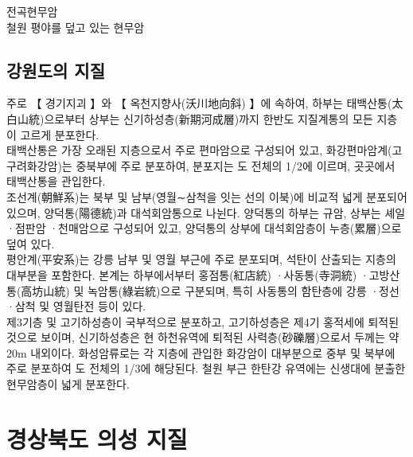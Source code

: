 \documentclass[12pt,a4paper]{book}
\newcommand{\SectionMargin}			{\newpage  \null \vskip 0cm}
\begin{document}
전곡현무암\\

철원 평야를 덮고 있는 현무암\\


	\SectionMargin
	\section{강원도의 지질}
	\null



주로 【 경기지괴 】와 【 옥천지향사(沃川地向斜) 】에 속하여, 하부는 태백산통(太白山統)으로부터 상부는 신기하성층(新期河成層)까지 한반도 지질계통의 모든 지층이 고르게 분포한다. \\

태백산통은 가장 오래된 지층으로서 주로 편마암으로 구성되어 있고, 화강편마암계(고구려화강암)는 중북부에 주로 분포하여, 분포지는 도 전체의 1/2에 이르며, 곳곳에서 태백산통을 관입한다. \\

조선계(朝鮮系)는 북부 및 남부(영월∼삼척을 잇는 선의 이북)에 비교적 넓게 분포되어 있으며, 양덕통(陽德統)과 대석회암통으로 나뉜다. 양덕통의 하부는 규암, 상부는 셰일 ·점판암 ·천매암으로 구성되어 있고, 양덕통의 상부에 대석회암층이 누층(累層)으로 덮여 있다. \\

평안계(平安系)는 강릉 남부 및 영월 부근에 주로 분포되며, 석탄이 산출되는 지층의 대부분을 포함한다. 본계는 하부에서부터 홍점통(紅店統) ·사동통(寺洞統) ·고방산통(高坊山統) 및 녹암통(綠岩統)으로 구분되며, 특히 사동통의 함탄층에 강릉 ·정선 ·삼척 및 영월탄전 등이 있다. \\

제3기층 및 고기하성층이 국부적으로 분포하고, 고기하성층은 제4기 홍적세에 퇴적된 것으로 보이며, 신기하성층은 현 하천유역에 퇴적된 사력층(砂礫層)으로서 두께는 약 20m 내외이다. 화성암류로는 각 지층에 관입한 화강암이 대부분으로 중부 및 북부에 주로 분포하여 도 전체의 1/3에 해당된다. 철원 부근 한탄강 유역에는 신생대에 분출한 현무암층이 넓게 분포한다. \\




\newpage
\chapter{경상북도 의성 지질}
\end{document}
